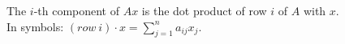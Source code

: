 \documentclass[preview]{standalone}
\begin{document}
\begin{center}
The $i$-th component of $Ax$ is the dot product of row $i$ of $A$ with $x$. \\In symbols: $(row\ i) \cdot x = \sum_{j=1}^{n} a_{ij} x_j.$
\end{center}
\end{document}
